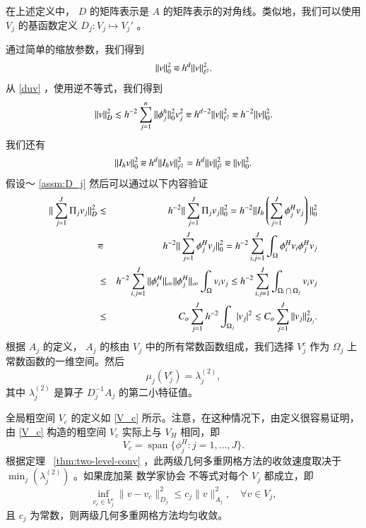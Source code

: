 \documentclass[12pt]{acta_2011xz}
\newcommand{\eqqsim}{\mathbin{\rotatebox[origin=c]{180}{\ensuremath{\cong}}}}
\newcommand{\co}{\ensuremath{C_{o}}}
\begin{document}
在上述定义中，   $D$    的矩阵表示是    $A$    的矩阵表示的对角线。类似地，我们可以使用    $V_j$    的基函数定义    $D_j :V_j\mapsto V_j'$   。  

通过简单的缩放参数，我们得到 
   \begin{equation*}
    \|v\|_0^2 \eqqsim h^d\|v\|_{\ell^2}^2.
\end{equation*}    从    \eqref{duv}    ，使用逆不等式，我们得到
   \begin{equation*}
    \|v\|_D^2\lesssim h^{-2}\sum_{j=1}^n\|\phi_j^h\|_0^2v_j^2\eqqsim h^{d-2}\|v\|_{\ell^2}^2\eqqsim h^{-2}\|v\|_0^2.
\end{equation*}    我们还有
   \begin{equation*}
    \|I_hv\|_0^2\eqqsim  h^d\|I_hv\|_{\ell^2}^2 = h^d\|v\|_{l^2}^2\eqqsim \|v\|_0^2.
\end{equation*}    假设〜   \ref{assm:D_j}    然后可以通过以下内容验证
   \begin{eqnarray*}
    \|\sum_{j=1}^{J}\Pi_jv_j\|_D^2 &\lesssim & h^{-2}\|\sum_{j=1}^J\Pi_jv_j\|_0^2 =h^{-2}\|I_h\left(\sum_{j=1}^J\phi_j^Hv_j\right)\|_0^2  \\ 
    &\eqqsim&h^{-2}\|\sum_{j=1}^J\phi_j^Hv_j\|_0^2 =h^{-2}\sum_{i,j=1}^{J}\int_{\Omega}\phi_i^Hv_i\phi_j^Hv_j \\ 
    &\le & h^{-2}\sum_{i,j=1}^{J}\|\phi_i^H\|_{\infty}\|\phi_j^H\|_{\infty}\int_{\Omega}v_iv_j\le h^{-2}\sum_{i, j=1}^{J}\int_{\Omega_i\bigcap\Omega_j}v_iv_j \\ 
    &\le &\co\sum_{j=1}^{J}h^{-2}\int_{\Omega_j}|v_j|^2\lesssim \co\sum_{j=1}^{J}\|v_j\|_{D_j}^2.
\end{eqnarray*}    根据    $A_j$    的定义，   $A_j$    的核由    $V_j$    中的所有常数函数组成，我们选择    $V_j^c$    作为    $\Omega_j$    上常数函数的一维空间。然后
   \begin{equation}
    \mu_j(V_j^c)=\lambda_j^{(2)},
\end{equation}    其中    $\lambda_j^{(2)}$    是算子    $D_j^{-1}A_j$    的第二小特征值。  

全局粗空间    $V_c$    的定义如    \eqref{V_c}    所示。注意，在这种情况下，由定义很容易证明，由    \eqref{V_c}    构造的粗空间    $V_c$    实际上与    $V_H$    相同，即
   \begin{equation}
    V_c=\operatorname{span} \{ \phi_j^H: j=1, \dots, J \} .
\end{equation}    根据定理~    \ref{thm:two-level-conv}    ，此两级几何多重网格方法的收敛速度取决于
   $\min_j(\lambda_j^{(2)})$    。如果庞加莱  { 数学家协会   }  不等式对每个    $V_j$    都成立，即
   \begin{equation}
    \inf_{v_c\in V_j^c} \|v-v_c\|_{D_j}^2\le c_j\|v\|_{A_j}^2, \quad \forall v\in V_j,
\end{equation}    且    $c_j$    为常数，则两级几何多重网格方法均匀收敛。  
\end{document}
